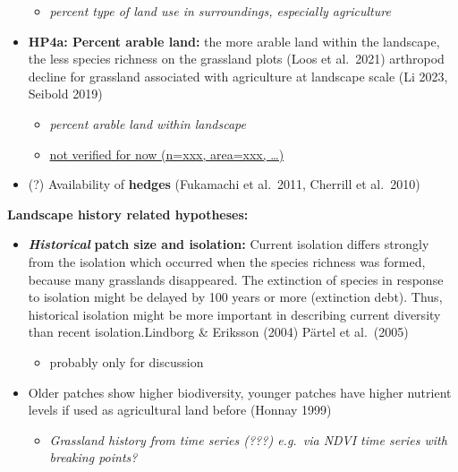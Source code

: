 \documentclass[
  letterpaper,
  DIV=11,
  numbers=noendperiod]{scrartcl}
\providecommand{\tightlist}{%
  \setlength{\itemsep}{0pt}\setlength{\parskip}{0pt}}\usepackage{longtable,booktabs,array}
\begin{document}
\begin{itemize}
  \begin{itemize}
  \tightlist
  \item
    \emph{percent type of land use in surroundings, especially
    agriculture}
  \end{itemize}
\item
  \textbf{HP4a: Percent arable land:} the more arable land within the
  landscape, the less species richness on the grassland plots (Loos et
  al.~2021) arthropod decline for grassland associated with agriculture
  at landscape scale (Li 2023, Seibold 2019)

  \begin{itemize}
  \item
    \emph{percent arable land within landscape}
  \item
    \uline{not verified for now (n=xxx, area=xxx, \ldots)}
  \end{itemize}
\item
  (?) Availability of \textbf{hedges} (Fukamachi et al.~2011, Cherrill
  et al.~2010)
\end{itemize}

\textbf{Landscape history related hypotheses:}

\begin{itemize}
\item
  \textbf{\emph{Historical}} \textbf{patch size and isolation:} Current
  isolation differs strongly from the isolation which occurred when the
  species richness was formed, because many grasslands disappeared. The
  extinction of species in response to isolation might be delayed by 100
  years or more (extinction debt). Thus, historical isolation might be
  more important in describing current diversity than recent
  isolation.Lindborg \& Eriksson (2004) Pärtel et al.~(2005)

  \begin{itemize}
  \tightlist
  \item
    probably only for discussion
  \end{itemize}
\item
  Older patches show higher biodiversity, younger patches have higher
  nutrient levels if used as agricultural land before (Honnay 1999)

  \begin{itemize}
  \tightlist
  \item
    \emph{Grassland history from time series (???) e.g.~via NDVI time
    series with breaking points?}
  \end{itemize}
\end{itemize}
\end{document}
